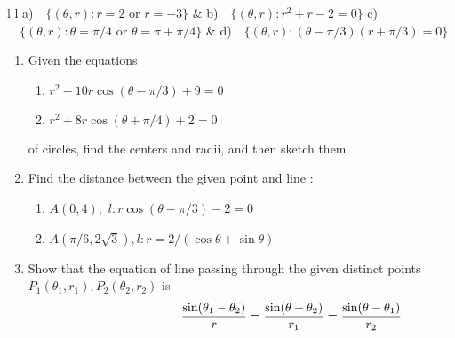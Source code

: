 \documentclass[11pt]{amsbook}
\begin{document}
    

\begin{tabular}{l   l}
         a)$\quad  \{(\theta,  r): r=2$ or $r=-3\}$ &
         b)$\quad \{(\theta,  r): r^2+r-2=0\}$ 
         c)$ \quad\{(\theta,  r):\theta=\pi/4$ or $\theta=\pi + \pi/4\}$ &
         d)$\quad\{(\theta, r): (\theta-\pi/3)(r+\pi/3)=0\}$ 

\end{tabular}





\begin{enumerate}

\item Given the equations
 
\begin{enumerate}
    

         
 \item \quad$r^2-10 r \cos(\theta-\pi/3)+9=0$ 
         
 \item  \quad$r^2+8 r \cos(\theta+\pi/4)+2=0$
 
 \end{enumerate}


 of circles, find the centers and radii, and then sketch them

\item Find the distance between the given point and line : 

\begin{enumerate}
    

         
\item $A(0,4),$ \quad\quad $l:r\cos(\theta - \pi/3)-2= 0$
         
\item $A(\pi/6, 2\sqrt{3}),$\quad\quad $l:r=2/(\cos\theta + \sin\theta )$
         
\end{enumerate}

\item Show that the equation of line passing through the given distinct points $P_1(\theta_1 ,r_1) , P_2(\theta_2 , r_2)$ is \\
\begin{equation*}

\hspace*{80pt}\dfrac{\sin(\theta_1-\theta_2)}{r}
= \dfrac{\sin(\theta-\theta_2)}{r_1}
=\dfrac{\sin(\theta-\theta_1)}{r_2}


\end{equation*}
\end{enumerate}
\end{document}
